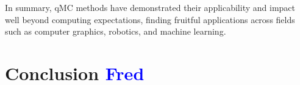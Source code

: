 \documentclass{svproc}
\begin{document}
In summary, qMC methods have demonstrated their applicability and impact well beyond computing expectations, finding fruitful applications across fields such as computer graphics, robotics, and machine learning.




\section{Conclusion \textcolor{blue}{Fred}} \label{sec:conclusion}





\end{document}
